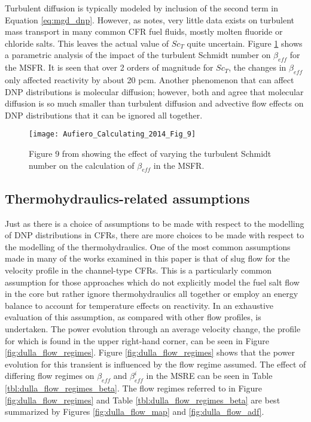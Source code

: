 \documentclass[review]{elsarticle}
\begin{document}
Turbulent diffusion is typically modeled by inclusion of the second term in
Equation \ref{eq:mgd_dnp}. However, as \cite{aufiero_calculating_2014} notes,
very little data exists on turbulent mass transport in many common
CFR fuel fluids, mostly molten fluoride or chloride salts. This leaves the
actual value of $Sc_{T}$ quite uncertain. Figure \ref{fig:aufiero_sc}
\cite{aufiero_calculating_2014} shows a parametric analysis of the impact of the
turbulent Schmidt number on $\beta_{eff}$ for the MSFR. It is seen
 that over 2 orders of magnitude for $Sc_{T}$, the changes in
$\beta_{eff}$ only
affected reactivity by about 20 pcm.
Another phenomenon that can affect DNP distributions
is molecular diffusion; however, both \cite{aufiero_calculating_2014} and
\cite{cheng_development_2014} agree that molecular diffusion is so much smaller
than turbulent diffusion and advective flow effects on DNP distributions that it
can be ignored all together.

\begin{figure}[H]
   \centering
   \texttt{[image: Aufiero\_Calculating\_2014\_Fig\_9]}
   \caption{Figure 9 from \cite{aufiero_calculating_2014} showing the effect of varying
   the turbulent Schmidt number on the calculation of $\beta_{eff}$ in the MSFR.}
   \label{fig:aufiero_sc}
\end{figure}

\subsection{Thermohydraulics-related assumptions} \label{th_asm}
Just as there is a choice of assumptions to be made with respect to the
modelling of DNP distributions in CFRs, there are more choices to be
made with respect to the modelling of the thermohydraulics. One of the most
common assumptions made in many of the works examined in this paper is that
of slug flow for the velocity profile in the channel-type CFRs. This is a
particularly common assumption for those approaches which do not explicitly
model the fuel salt flow in the core but rather ignore thermohydraulics
all together or employ an energy balance to account for temperature effects
on reactivity. In \cite{dulla_interactions_2007} an exhaustive evaluation
of this assumption, as compared with other flow profiles, is undertaken.
The power evolution through an average velocity change, the profile for which
is found
in the upper right-hand corner, can be seen in Figure 
\ref{fig:dulla_flow_regimes}. Figure \ref{fig:dulla_flow_regimes}
shows that the power evolution for this transient is 
influenced by the flow regime assumed. The effect of differing flow regimes
on $\beta_{eff}$ and $\beta_{eff}^{i}$ in the MSRE can be seen in Table
\ref{tbl:dulla_flow_regimes_beta}. The flow regimes referred to in Figure
\ref{fig:dulla_flow_regimes} and Table \ref{tbl:dulla_flow_regimes_beta} are
best 
summarized by Figures \ref{fig:dulla_flow_map} and \ref{fig:dulla_flow_adf}.
\end{document}
